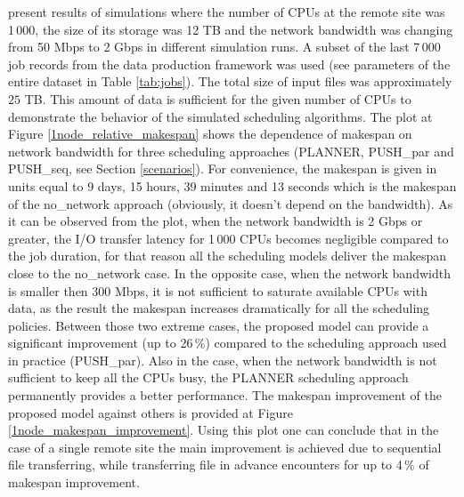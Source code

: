 \documentclass{svjour3}                     %
\begin{document}
present results of simulations where the number of CPUs at the remote site was 1\,000, the size of its storage was 12 TB and the network bandwidth was changing from 50 Mbps to 2 Gbps in different simulation runs. A subset of the last 7\,000 job records from the data production framework was used (see parameters of the entire dataset in Table \ref{tab:jobs}). The total size of input files was approximately $25$ TB. This amount of data is sufficient for the given number of CPUs to demonstrate the behavior of the simulated scheduling algorithms. The plot at Figure \ref{1node_relative_makespan} shows the dependence of makespan on network bandwidth for three scheduling approaches (PLANNER, PUSH\_par and PUSH\_seq, see Section \ref{scenarios}). For convenience, the makespan is given in units equal to 9 days, 15 hours, 39 minutes and 13 seconds which is the makespan of the no\_network approach (obviously, it doesn't depend on the bandwidth). As it can be observed from the plot, when the network bandwidth is 2 Gbps or greater, the I/O transfer latency for 1\,000 CPUs becomes negligible compared to the job duration, for that reason all the scheduling models deliver the makespan close to the no\_network case. In the opposite case, when the network bandwidth is smaller then 300 Mbps, it is not sufficient to saturate available CPUs with data, as the result the makespan increases dramatically for all the scheduling policies. Between those two extreme cases, the proposed model can provide a significant improvement (up to 26\,\%) compared to the scheduling approach used in practice (PUSH\_par). Also in the case, when the network bandwidth is not sufficient to keep all the CPUs busy, the PLANNER scheduling approach permanently provides a better performance. The makespan improvement of the proposed model against others is provided at Figure \ref{1node_makespan_improvement}. Using this plot one can conclude that in the case of a single remote site the main improvement is achieved due to sequential file transferring, while transferring file in advance encounters for up to 4\,\% of makespan improvement.
\end{document}
